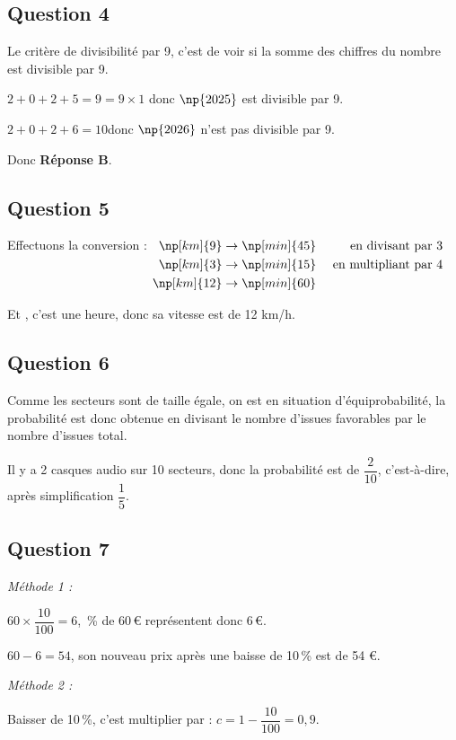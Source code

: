 \documentclass[12pt,a4paper,french]{article}
\begin{document}
	\subsection*{Question 4}
		Le critère de divisibilité par 9, c'est de voir si la somme des chiffres du nombre est divisible par 9.

		$2+0+2+5=9 = 9 \times 1$ \quad donc $\np{2025}$ est divisible par 9.

		$2+0+2+6=10 $\quad donc \quad $\np{2026}$ n'est pas divisible par 9.

		Donc \textbf{Réponse B}.

	\subsection*{Question 5}
		Effectuons la conversion :
		\quad
		$\begin{aligned}[t]
		\np[km]{9}  &\to  \np[min]{45} &\text{ en divisant par 3}\\
		\np[km]{3}  &\to  \np[min]{15} & \text{ en multipliant par 4}\\
		\np[km]{12} &\to  \np[min]{60} & \\
		\end{aligned}$

		Et , c'est une heure, donc sa vitesse est de 12 km/h.

	\subsection*{Question 6}
		Comme les secteurs sont de taille égale, on est en situation d'équiprobabilité, la probabilité est donc obtenue en divisant le nombre d'issues favorables par le nombre d'issues total.

		Il y a 2 casques audio sur 10 secteurs, donc la probabilité est de $\dfrac{2}{10}$, c'est-à-dire, après simplification $\dfrac{1}{5}$.

	\subsection*{Question 7}

		\emph{Méthode 1 :}

		$60\times \dfrac{10}{100}=6$, \,\% de 60\,\euro{} représentent donc 6\,\euro{}.

		$60-6=54$, \quad son nouveau prix après une baisse de 10\,\% est de 54 \euro{}.

		\emph{Méthode 2 :}

		Baisser de 10\,\%, c'est multiplier par : \quad $c = 1 - \dfrac{10}{100} = 0,9$.
\end{document}
